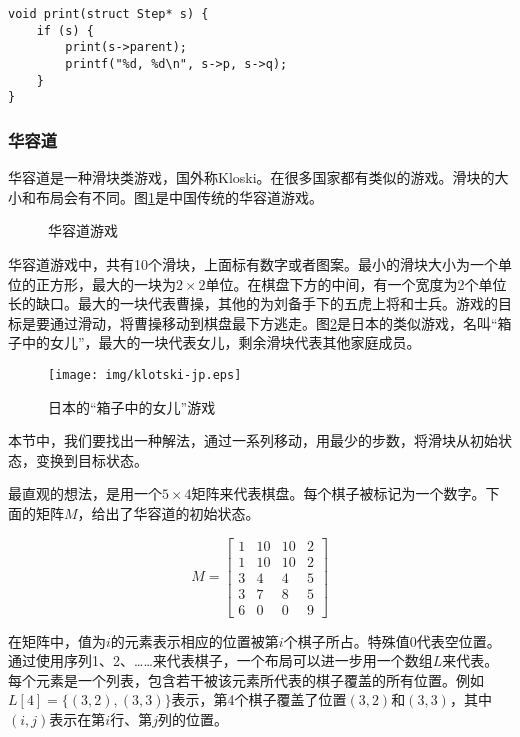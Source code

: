 \documentclass[UTF8]{article}
\begin{document}
\lstset{language=C}
\begin{lstlisting}
void print(struct Step* s) {
    if (s) {
        print(s->parent);
        printf("%d, %d\n", s->p, s->q);
    }
}
\end{lstlisting}

\subsubsection{华容道}

华容道是一种滑块类游戏，国外称Kloski。在很多国家都有类似的游戏。滑块的大小和布局会有不同。图\ref{fig:klotski-cn}是中国传统的华容道游戏。

\begin{figure}[htbp]
 \centering
  \hspace{.01\textwidth}
 \caption{华容道游戏}
 \label{fig:klotski-cn}
\end{figure}

华容道游戏中，共有10个滑块，上面标有数字或者图案。最小的滑块大小为一个单位的正方形，最大的一块为$2 \times 2$单位。在棋盘下方的中间，有一个宽度为2个单位长的缺口。最大的一块代表曹操，其他的为刘备手下的五虎上将和士兵。游戏的目标是要通过滑动，将曹操移动到棋盘最下方逃走。图\ref{fig:klotski-jp}是日本的类似游戏，名叫“箱子中的女儿”，最大的一块代表女儿，剩余滑块代表其他家庭成员。

\begin{figure}[htbp]
 \centering
 \texttt{[image: img/klotski-jp.eps]}
 \caption{日本的“箱子中的女儿”游戏}
 \label{fig:klotski-jp}
\end{figure}

本节中，我们要找出一种解法，通过一系列移动，用最少的步数，将滑块从初始状态，变换到目标状态。

最直观的想法，是用一个$5 \times 4$矩阵来代表棋盘。每个棋子被标记为一个数字。下面的矩阵$M$，给出了华容道的初始状态。

\[
M = \left [
  \begin{array}{cccc}
  1 & 10 & 10 & 2 \\
  1 & 10 & 10 & 2 \\
  3 & 4 & 4 & 5 \\
  3 & 7 & 8 & 5 \\
  6 & 0 & 0 & 9
  \end{array}
\right ]
\]

在矩阵中，值为$i$的元素表示相应的位置被第$i$个棋子所占。特殊值0代表空位置。通过使用序列1、2、……来代表棋子，一个布局可以进一步用一个数组$L$来代表。每个元素是一个列表，包含若干被该元素所代表的棋子覆盖的所有位置。例如$L[4] = \{(3, 2), (3, 3)\}$表示，第4个棋子覆盖了位置$(3, 2)$和$(3, 3)$，其中$(i, j)$表示在第$i$行、第$j$列的位置。
\end{document}
